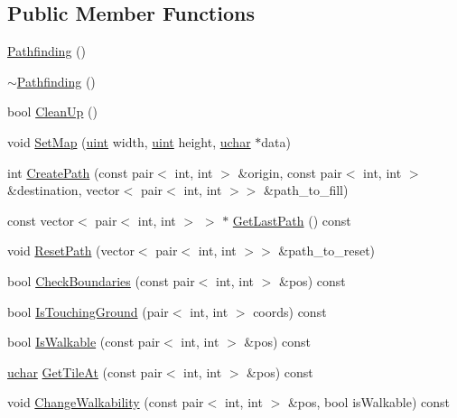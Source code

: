 \subsection*{Public Member Functions}
\begin{DoxyCompactItemize}
\item 
\mbox{\hyperlink{class_pathfinding_aae14d204c5f9ee6b184764f874711341}{Pathfinding}} ()
\item 
\mbox{\hyperlink{class_pathfinding_a1869823af12d301105cf1cedbe9a8dc5}{$\sim$\+Pathfinding}} ()
\item 
bool \mbox{\hyperlink{class_pathfinding_ac377b4477dad76360fdb4c64e52d80f6}{Clean\+Up}} ()
\item 
void \mbox{\hyperlink{class_pathfinding_a375f914454c44e1ca70545853a950efe}{Set\+Map}} (\mbox{\hyperlink{_defs_8h_a91ad9478d81a7aaf2593e8d9c3d06a14}{uint}} width, \mbox{\hyperlink{_defs_8h_a91ad9478d81a7aaf2593e8d9c3d06a14}{uint}} height, \mbox{\hyperlink{_defs_8h_a65f85814a8290f9797005d3b28e7e5fc}{uchar}} $\ast$data)
\item 
int \mbox{\hyperlink{class_pathfinding_a81f4b825973f68ff3e0c984eee049309}{Create\+Path}} (const pair$<$ int, int $>$ \&origin, const pair$<$ int, int $>$ \&destination, vector$<$ pair$<$ int, int $>$$>$ \&path\+\_\+to\+\_\+fill)
\item 
const vector$<$ pair$<$ int, int $>$ $>$ $\ast$ \mbox{\hyperlink{class_pathfinding_aabee4bd29cea753c592a5fe9d595608a}{Get\+Last\+Path}} () const
\item 
void \mbox{\hyperlink{class_pathfinding_ae4aeb687f1532dcd340204e35a415d9e}{Reset\+Path}} (vector$<$ pair$<$ int, int $>$$>$ \&path\+\_\+to\+\_\+reset)
\item 
bool \mbox{\hyperlink{class_pathfinding_a07821f23e40533dead35728d058d8136}{Check\+Boundaries}} (const pair$<$ int, int $>$ \&pos) const
\item 
bool \mbox{\hyperlink{class_pathfinding_a26965e2ab0d36f45e82642e14a853b2d}{Is\+Touching\+Ground}} (pair$<$ int, int $>$ coords) const
\item 
bool \mbox{\hyperlink{class_pathfinding_adb3abbc864c78d5f3acbf7dda6c9cf7b}{Is\+Walkable}} (const pair$<$ int, int $>$ \&pos) const
\item 
\mbox{\hyperlink{_defs_8h_a65f85814a8290f9797005d3b28e7e5fc}{uchar}} \mbox{\hyperlink{class_pathfinding_a531ff73d3dcc30449d706ab441552654}{Get\+Tile\+At}} (const pair$<$ int, int $>$ \&pos) const
\item 
void \mbox{\hyperlink{class_pathfinding_a8bbd828bcabd0d5f2cf271053cc76a36}{Change\+Walkability}} (const pair$<$ int, int $>$ \&pos, bool is\+Walkable) const
\end{DoxyCompactItemize}
